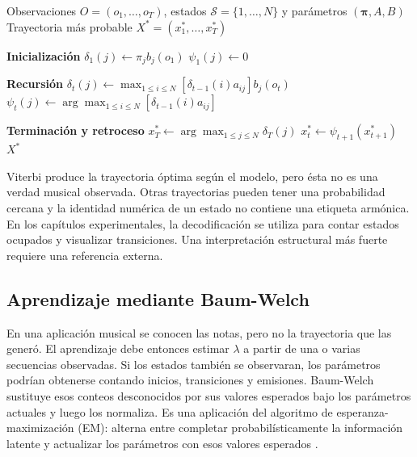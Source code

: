 \begin{algorithm}[H]
\caption{Algoritmo de Viterbi}
\label{alg:viterbi}
\begin{algorithmic}[1]
\Require Observaciones $O=(o_1,\dots,o_T)$, estados $\mathcal{S}=\{1,\dots,N\}$ y parámetros $(\boldsymbol{\pi},A,B)$
\Ensure Trayectoria más probable $X^*=(x_1^*,\dots,x_T^*)$

\Statex
\State \textbf{Inicialización}
    \State $\delta_1(j)\gets\pi_jb_j(o_1)$
    \State $\psi_1(j)\gets 0$
\EndFor

\Statex
\State \textbf{Recursión}
        \State $\delta_t(j)\gets\displaystyle\max_{1\leq i\leq N}\left[\delta_{t-1}(i)a_{ij}\right]b_j(o_t)$
        \State $\psi_t(j)\gets\displaystyle\arg\max_{1\leq i\leq N}\left[\delta_{t-1}(i)a_{ij}\right]$
    \EndFor
\EndFor

\Statex
\State \textbf{Terminación y retroceso}
\State $x_T^*\gets\displaystyle\arg\max_{1\leq j\leq N}\delta_T(j)$
    \State $x_t^*\gets\psi_{t+1}(x_{t+1}^*)$
\EndFor
\State \Return $X^*$
\end{algorithmic}
\end{algorithm}

Viterbi produce la trayectoria óptima según el modelo, pero ésta no es una verdad musical observada. Otras trayectorias pueden tener una probabilidad cercana y la identidad numérica de un estado no contiene una etiqueta armónica. En los capítulos experimentales, la decodificación se utiliza para contar estados ocupados y visualizar transiciones. Una interpretación estructural más fuerte requiere una referencia externa.

\subsection{Aprendizaje mediante Baum-Welch}

En una aplicación musical se conocen las notas, pero no la trayectoria que las generó. El aprendizaje debe entonces estimar $\lambda$ a partir de una o varias secuencias observadas. Si los estados también se observaran, los parámetros podrían obtenerse contando inicios, transiciones y emisiones. Baum-Welch sustituye esos conteos desconocidos por sus valores esperados bajo los parámetros actuales y luego los normaliza. Es una aplicación del algoritmo de esperanza-maximización (EM): alterna entre completar probabilísticamente la información latente y actualizar los parámetros con esos valores esperados \cite{rabiner1989}.

